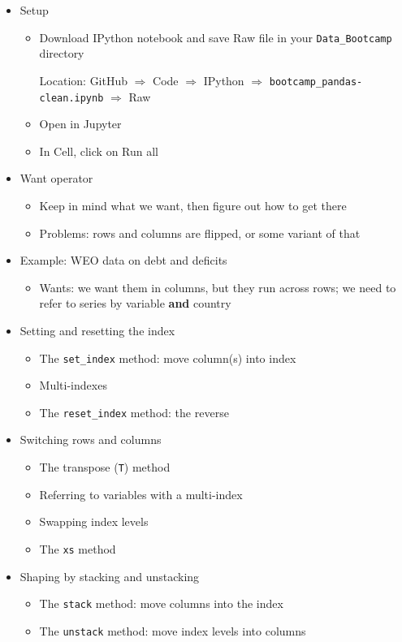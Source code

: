 \documentclass[11pt]{article}
\begin{document}
\begin{itemize}
\item Setup
\begin{itemize}
\item Download IPython notebook and save Raw file in your \verb|Data_Bootcamp| directory

Location:  GitHub $\Rightarrow$ Code $\Rightarrow$ IPython $\Rightarrow$
 \verb|bootcamp_pandas-clean.ipynb| $\Rightarrow$ Raw

\item Open in Jupyter
\item In Cell, click on Run all 
\end{itemize}

\item {Want operator}
\begin{itemize}
\item Keep in mind what we want, then figure out how to get there
\item Problems:  rows and columns are flipped, or some variant of that
\end{itemize}

\item Example:  WEO data on debt and deficits 
\begin{itemize}
\item Wants:  we want them in columns, but they run across rows; 
we need to refer to 
series by variable {\bf and} country 
\end{itemize}

\item Setting and resetting the index 
\begin{itemize}
\item The \verb|set_index| method:  move column(s) into index 
\item Multi-indexes 
\item The \verb|reset_index| method:  the reverse 
\end{itemize}

\item Switching rows and columns 
\begin{itemize}
\item The transpose ({\tt T}) method 
\item Referring to variables with a multi-index
\item Swapping index levels 
\item The {\tt xs} method 
\end{itemize}

\item Shaping by stacking and unstacking 
\begin{itemize}
\item The {\tt stack} method:  move columns into the index
\item The {\tt unstack} method:  move index levels into columns 
\end{itemize}


\end{itemize}
\end{document}

